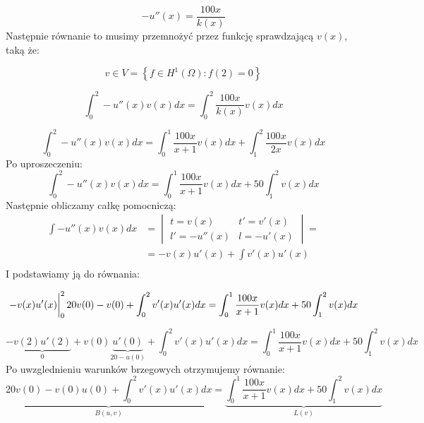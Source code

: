 \documentclass[12pt]{article}
\begin{document}
\begin{equation}
    -u''(x) = \frac{100x}{k(x)}
\end{equation}
% 
Następnie równanie to musimy przemnożyć przez funkcję sprawdzającą $v(x)$, taką że:

\begin{equation}
    v \in V = \left\{f \in H^1(\Omega) : f(2) = 0 \right\}
\end{equation}
% 

\begin{equation}
    \int_{0}^{2} -u''(x) v(x) dx = \int_{0}^{2} \frac{100x}{k(x)} v(x) dx
\end{equation}
% 

\begin{equation}
    \int_{0}^{2} -u''(x) v(x) dx 
    = \int_{0}^{1} \frac{100x}{x+1} v(x) dx
    + \int_{1}^{2} \frac{100x}{2x} v(x) dx
\end{equation}
% 
Po uproszeczeniu:
\begin{equation}
    \int_{0}^{2} -u''(x) v(x) dx 
    = \int_{0}^{1} \frac{100x}{x+1} v(x) dx
    + 50\int_{1}^{2} v(x) dx
\end{equation}
% 
Następnie obliczamy całkę pomocniczą:
\begin{equation}
    \begin{split}
        \int -u''(x) v(x) dx 
        & = \begin{vmatrix}
            t = v(x) & t' = v'(x) \\
            l' = -u''(x) & l = -u'(x)
        \end{vmatrix} = \\
        & = -v(x)u'(x) + \int v'(x) u'(x) \\
    \end{split}
\end{equation}
% 
I podstawiamy ją do równania:

\begin{equation}
    \eval{-v(x)u'(x)}_0^2 
    20v(0) - v(0)
    + \int_0^2 v'(x) u'(x) dx
    = \int_{0}^{1} \frac{100x}{x+1} v(x) dx
    + 50\int_{1}^{2} v(x) dx
\end{equation}

\begin{equation}
    - \underbrace{v(2)u'(2)}_0
    + v(0)\underbrace{u'(0)}_{20 - u(0)}
    + \int_0^2 v'(x) u'(x) dx
    = \int_{0}^{1} \frac{100x}{x+1} v(x) dx
    + 50\int_{1}^{2} v(x) dx
\end{equation}
% 
Po uwzglednieniu warunków brzegowych otrzymujemy równanie:
\begin{equation} \label{eq:finish}
    \underbrace{
        20v(0)
        - v(0)u(0)    
        + \int_0^2 v'(x) u'(x) dx
    }_{B(u,v)}
    = 
    \underbrace{
        \int_{0}^{1} \frac{100x}{x+1} v(x) dx
        + 50\int_{1}^{2} v(x) dx
    }_{L(v)}
\end{equation}
\end{document}
